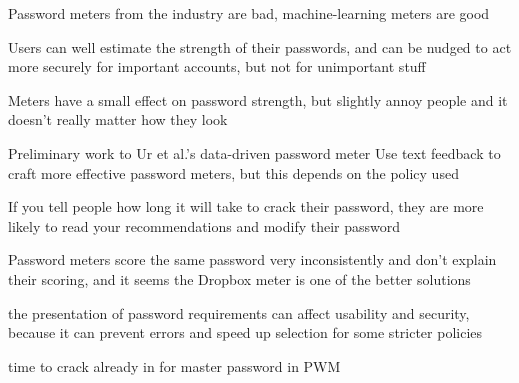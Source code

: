 	Password meters from the industry are bad, machine-learning meters are good \cite{Wang2016fuzzyPWM}
	
	Users can well estimate the strength of their passwords, and can be nudged to act more securely for important accounts, but not for unimportant stuff \cite{Egelman2013DoesMyPasswordGoUpToEleven}
	
	Meters have a small effect on password strength, but slightly annoy people and it doesn't really matter how they look \cite{Ur2012HowDoesYourPasswordMeasureUp}
	
	Preliminary work to Ur et al.'s data-driven password meter \cite{Eargle2015YouCanDoBetter}
	Use text feedback to craft more effective password meters, but this depends on the policy used \cite{Ur2017DataDrivenPWMeter}
	
	If you tell people how long it will take to crack their password, they are more likely to read your recommendations and modify their password \cite{Vance2013FearAppeals}
	
	Password meters score the same password very inconsistently and don't explain their scoring, and it seems the Dropbox meter is one of the better solutions \cite{Carnavalet2014AnalyzingPWStrengthMeters}
	
	the presentation of password requirements can affect usability and security, because it can prevent errors and speed up selection for some stricter policies \cite{Shay2015SpoonfulOfSugar}
	
	time to crack already in \cite{Yee2006Passpet} for master password in PWM
	
	
	
		

